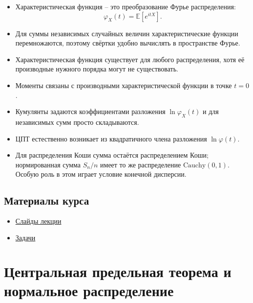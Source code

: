 \documentclass[
  russian,
  12pt,
  a4paper,
  a4paper,
  openany]{scrbook}
\providecommand{\tightlist}{%
  \setlength{\itemsep}{0pt}\setlength{\parskip}{0pt}}
\begin{document}
\begin{bookchaptersummary}

\begin{itemize}
\tightlist
\item
  Характеристическая функция -- это преобразование Фурье распределения:
  \[\varphi_X(t)=\mathbb{E}[e^{itX}].\]
\item
  Для суммы независимых случайных величин характеристические функции
  перемножаются, поэтому свёртки удобно вычислять в пространстве Фурье.
\item
  Характеристическая функция существует для любого распределения, хотя
  её производные нужного порядка могут не существовать.
\item
  Моменты связаны с производными характеристической функции в точке
  \(t=0\).
\item
  Кумулянты задаются коэффициентами разложения \(\ln\varphi_X(t)\) и для
  независимых сумм просто складываются.
\item
  ЦПТ естественно возникает из квадратичного члена разложения
  \(\ln\varphi(t)\).
\item
  Для распределения Коши сумма остаётся распределением Коши;
  нормированная сумма \(S_n/n\) имеет то же распределение
  \(\mathrm{Cauchy}(0,1)\). Особую роль в этом играет условие конечной
  дисперсии.
\end{itemize}

\end{bookchaptersummary}

\section{Материалы
курса}\label{ux43cux430ux442ux435ux440ux438ux430ux43bux44b-ux43aux443ux440ux441ux430}

\begin{itemize}
\tightlist
\item
  \href{https://neutrinohit.github.io/statistical-analysis-course/ru/slides/02_characteristic_functions.html}{Слайды
  лекции}
\item
  \href{https://neutrinohit.github.io/statistical-analysis-course/ru/slides/exercises/02_characteristic_functions_exercises.html}{Задачи}
\end{itemize}

\chapter{Центральная предельная теорема и нормальное
распределение}\label{ux446ux435ux43dux442ux440ux430ux43bux44cux43dux430ux44f-ux43fux440ux435ux434ux435ux43bux44cux43dux430ux44f-ux442ux435ux43eux440ux435ux43cux430-ux438-ux43dux43eux440ux43cux430ux43bux44cux43dux43eux435-ux440ux430ux441ux43fux440ux435ux434ux435ux43bux435ux43dux438ux435}
\end{document}
